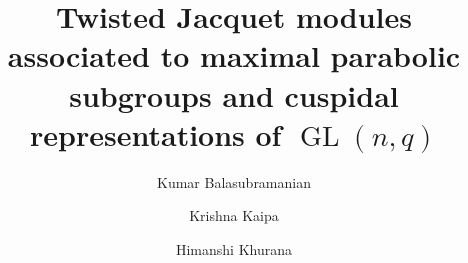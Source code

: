 \documentclass[reqno]{amsart}
\theoremstyle{definition}
\theoremstyle{remark}
\numberwithin{equation}{section}
\DeclareMathOperator{\GL}{GL}
\begin{document}
\title[Twisted Jacquet modules of cuspidal representations of $\GL(n, q)$]{Twisted Jacquet modules associated to maximal parabolic subgroups and  cuspidal representations of $\GL(n, q)$}
\author{Kumar Balasubramanian} 
\address{Department of Mathematics\\
IISER Bhopal\\
Bhopal, Madhya Pradesh 462066, India}
\author{Krishna Kaipa} 
\address{Department of Mathematics\\
IISER Pune\\
Pune, Maharashtra 411008, India}
\author{Himanshi Khurana}
\address{ ${}^1$ Department of Mathematics\\
Harish-Chandra Research Institute\\
Prayagraj, Uttar Pradesh 211019, India
\newline ${}^2$ Homi Bhabha National Institute\\
Training School Complex, Anushakti Nagar\\
Mumbai 400094, India}
\end{document}
